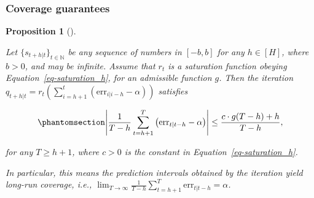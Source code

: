 \documentclass[
  11pt,
  a4paper,
]{article}
\theoremstyle{plain}
\newtheorem{proposition}{Proposition}[section]
\theoremstyle{plain}
\theoremstyle{remark}
\begin{document}
\subsubsection{Coverage guarantees}\label{coverage-guarantees}

\begin{proposition}[]\protect\hypertarget{prp-cov_rt}{}\label{prp-cov_rt}

Let \(\{s_{t+h|t}\}_{t\in\mathbb{N}}\) be any sequence of numbers in
\([-b, b]\) for any \(h\in[H]\), where \(b>0\), and may be infinite.
Assume that \(r_t\) is a saturation function obeying
Equation~\ref{eq-saturation_h}, for an admissible function \(g\). Then
the iteration
\(q_{t+h|t}=r_t\left(\sum_{i=h+1}^t\left(\mathrm{err}_{i|i-h}-\alpha\right)\right)\)
satisfies

\begin{equation}\phantomsection\label{eq-cov_rt}{
\left|\frac{1}{T-h}\sum_{t=h+1}^{T}\left(\mathrm{err}_{t|t-h}-\alpha\right)\right| \leq \frac{c \cdot g(T-h) + h}{T-h},
}\end{equation}

for any \(T \geq h+1\), where \(c>0\) is the constant in
Equation~\ref{eq-saturation_h}.

In particular, this means the prediction intervals obtained by the
iteration yield long-run coverage, i.e.,
\(\lim _{T \rightarrow \infty} \frac{1}{T-h} \sum_{t=h+1}^T \mathrm{err}_{t|t-h} = \alpha\).

\end{proposition}
\end{document}
